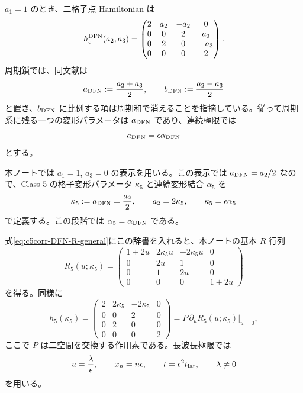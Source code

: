 $a_1=1$ のとき、二格子点 Hamiltonian は
\begin{equation}
h^{\rm DFN}_5(a_2,a_3)=
\begin{pmatrix}
2&a_2&-a_2&0\\
0&0&2&a_3\\
0&2&0&-a_3\\
0&0&0&2
\end{pmatrix}.
\label{eq:c5corr-DFN-h}
\end{equation}
周期鎖では、同文献は
\begin{equation}
a_{\rm DFN}:=\frac{a_2+a_3}{2},
\qquad
b_{\rm DFN}:=\frac{a_2-a_3}{2}
\label{eq:c5corr-DFN-ab}
\end{equation}
と置き、$b_{\rm DFN}$ に比例する項は周期和で消えることを指摘している。従って周期系に残る一つの変形パラメータは $a_{\rm DFN}$ であり、連続極限では
\begin{equation}
a_{\rm DFN}=\epsilon\alpha_{\rm DFN}
\label{eq:c5corr-DFN-scaling}
\end{equation}
とする。

本ノートでは $a_1=1$, $a_3=0$ の表示を用いる。この表示では $a_{\rm DFN}=a_2/2$ なので、Class 5 の格子変形パラメータ $\kappa_5$ と連続変形結合 $\alpha_5$ を
\begin{equation}
\kappa_5:=a_{\rm DFN}=\frac{a_2}{2},
\qquad
a_2=2\kappa_5,
\qquad
\kappa_5=\epsilon\alpha_5
\label{eq:c5corr-parameter-dictionary}
\end{equation}
で定義する。この段階では $\alpha_5=\alpha_{\rm DFN}$ である。

式\eqref{eq:c5corr-DFN-R-general}にこの辞書を入れると、本ノートの基本 $R$ 行列
\begin{equation}
R_5(u;\kappa_5)=
\begin{pmatrix}
1+2u&2\kappa_5u&-2\kappa_5u&0\\
0&2u&1&0\\
0&1&2u&0\\
0&0&0&1+2u
\end{pmatrix}
\label{eq:c5corr-R}
\end{equation}
を得る。同様に
\begin{equation}
h_5(\kappa_5)=
\begin{pmatrix}
2&2\kappa_5&-2\kappa_5&0\\
0&0&2&0\\
0&2&0&0\\
0&0&0&2
\end{pmatrix}
=P\,\partial_uR_5(u;\kappa_5)\big|_{u=0},
\label{eq:c5corr-h}
\end{equation}
ここで $P$ は二空間を交換する作用素である。長波長極限では
\begin{equation}
u=\frac{\lambda}{\epsilon},
\qquad x_n=n\epsilon,
\qquad t=\epsilon^2t_{\rm lat},
\qquad \lambda\ne0
\label{eq:c5corr-scaling}
\end{equation}
を用いる。

